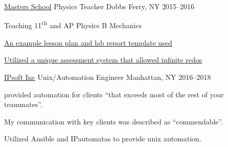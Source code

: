 \begin{cventries}
\cventry
    {\href{mastersny.org}{Masters School}}
    {Physics Teacher}
    {Dobbs Ferry, NY} {2015--2016}
    {
    \begin{cvitems}
      \item {Teaching 11\textsuperscript{th} and AP Physics B Mechanics}
      \item {\href{https://github.com/jphafner/physicsReport}{An example lesson plan and lab report template used}}
      \item {\href{https://github.com/jphafner/physicsAMC}{Utilized a unique assessment system that allowed infinite redos}}
    \end{cvitems}
    }

\cventry
    {\href{www.ipsoft.com}{IPsoft Inc}}
    {Unix/Automation Engineer}
    {Manhattan, NY}
    {2016--2018}
    {
    \begin{cvitems}
      \item {provided automation for clients ``that exceeds most of the rest of your teammates''.}
      \item {My communication with key clients was described as ``commendable''.} 
      \item {Utilized Ansible and IPautomatas to provide unix automation.} 
    \end{cvitems}
    }

\end{cventries}


